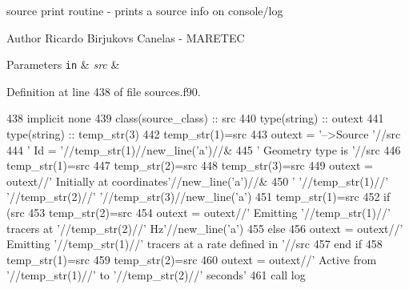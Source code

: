 source print routine -\/ prints a source info on console/log 

\begin{DoxyAuthor}{Author}
Ricardo Birjukovs Canelas -\/ M\+A\+R\+E\+T\+EC 
\end{DoxyAuthor}

\begin{DoxyParams}[1]{Parameters}
\mbox{\tt in}  & {\em src} & \\
\hline
\end{DoxyParams}


Definition at line 438 of file sources.\+f90.


\begin{DoxyCode}
438     \textcolor{keywordtype}{implicit none}
439     \textcolor{keywordtype}{class}(source\_class) :: src
440     \textcolor{keywordtype}{type}(string) :: outext
441     \textcolor{keywordtype}{type}(string) :: temp\_str(3)
442     temp\_str(1)=src%
443     outext = \textcolor{stringliteral}{'-->Source '}//src%
444         \textcolor{stringliteral}{'       Id = '}//temp\_str(1)//new\_line(\textcolor{stringliteral}{'a'})//&
445         \textcolor{stringliteral}{'       Geometry type is '}//src%
446     temp\_str(1)=src%
447     temp\_str(2)=src%
448     temp\_str(3)=src%
449     outext = outext//\textcolor{stringliteral}{'       Initially at coordinates'}//new\_line(\textcolor{stringliteral}{'a'})//&
450         \textcolor{stringliteral}{'       '}//temp\_str(1)//\textcolor{stringliteral}{' '}//temp\_str(2)//\textcolor{stringliteral}{' '}//temp\_str(3)//new\_line(\textcolor{stringliteral}{'a'})
451     temp\_str(1)=src%
452     \textcolor{keywordflow}{if} (src%
453         temp\_str(2)=src%
454         outext = outext//\textcolor{stringliteral}{'       Emitting '}//temp\_str(1)//\textcolor{stringliteral}{' tracers at '}//temp\_str(2)//\textcolor{stringliteral}{' Hz'}//new\_line(\textcolor{stringliteral}{'a'})
455     \textcolor{keywordflow}{else}
456         outext = outext//\textcolor{stringliteral}{'       Emitting '}//temp\_str(1)//\textcolor{stringliteral}{' tracers at a rate defined in '}//src%
457 \textcolor{keywordflow}{    end if}
458     temp\_str(1)=src%
459     temp\_str(2)=src%
460     outext = outext//\textcolor{stringliteral}{'       Active from '}//temp\_str(1)//\textcolor{stringliteral}{' to '}//temp\_str(2)//\textcolor{stringliteral}{' seconds'}
461     \textcolor{keyword}{call }log%
\end{DoxyCode}
\mbox{\label{namespacesources__mod_a9a62c41b71d2d6ad85def74087542ef5}} 
